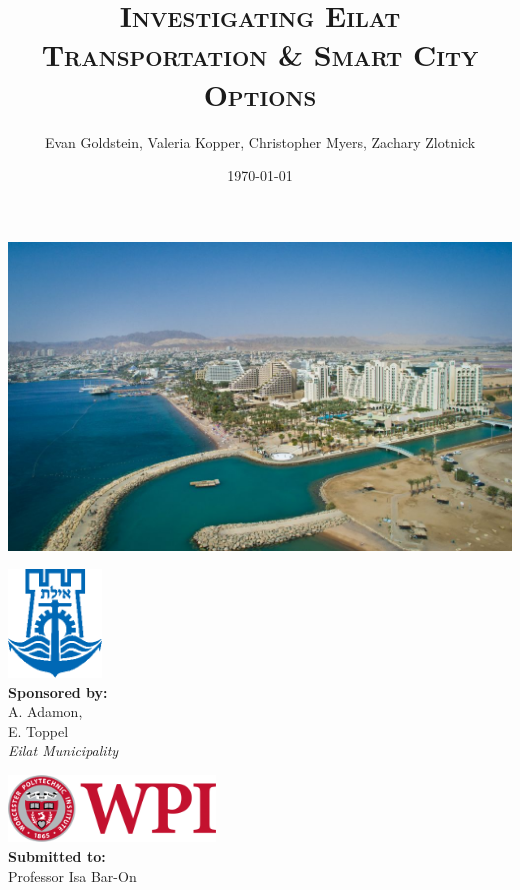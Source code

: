 \documentclass[12pt]{article}                               %
\title{\scshape Investigating Eilat Transportation \& Smart City Options}
\author{Evan Goldstein, Valeria Kopper, Christopher Myers, Zachary Zlotnick}
\date{\today}
\begin{document}
\maketitle

\begin{center}
    \includegraphics[width=1\textwidth]{images/eilat.jpg}
\end{center}
\vspace{0.5cm}

\begin{minipage}{0.45\textwidth}
    \begin{flushleft} \large
        \includegraphics[width=2.5cm]{images/eilat_logo.png} \\
        \textbf{Sponsored by:} \\
        A. Adamon, \\
        E. Toppel \\
        \textit{Eilat Municipality}
    \end{flushleft}
\end{minipage}
\begin{minipage}{0.45\textwidth}
    \begin{flushright} \large
        \href{https://www.wpi.edu}{\includegraphics[width=5.5cm]{images/WPI_logo.png}} \\
        \vspace{1.0cm}
        \textbf{Submitted to:}\\
        Professor Isa Bar-On
        \vspace{1.5cm}
    \end{flushright}
\end{minipage}
\newpage
\end{document}
